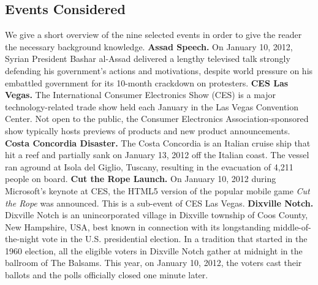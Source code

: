 \subsection{Events Considered}
We give a short overview of the nine selected events in order to give the reader the necessary background knowledge.
\newline
\textbf{Assad Speech.} On January 10, 2012, Syrian President Bashar al-Assad delivered a lengthy televised talk strongly defending his government's actions and motivations, despite world pressure on his embattled government for its 10-month crackdown on protesters.
\newline
\textbf{CES Las Vegas.} The International Consumer Electronics Show (CES) is a major technology-related trade show held each January in the Las Vegas Convention Center. Not open to the public, the Consumer Electronics Association-sponsored show typically hosts previews of products and new product announcements.
\newline
\textbf{Costa Concordia Disaster.} The Costa Concordia is an Italian cruise ship that hit a reef and partially sank on January 13, 2012 off the Italian coast.
The vessel ran aground at Isola del Giglio, Tuscany, resulting in the evacuation of 4,211 people on board.
\newline
\textbf{Cut the Rope Launch.} On January 10, 2012 during Microsoft's keynote at CES, the HTML5 version of the popular mobile game \textit{Cut the Rope} was announced. This is a sub-event of CES Las Vegas.
\newline
\textbf{Dixville Notch.} Dixville Notch is an unincorporated village in Dixville township of Coos County, New Hampshire, USA, best known in connection with its longstanding middle-of-the-night vote in the U.S. presidential election. In a tradition that started in the 1960 election, all the eligible voters in Dixville Notch gather at midnight in the ballroom of The Balsams. This year, on January 10, 2012, the voters cast their ballots and the polls officially closed one minute later.
\newline
